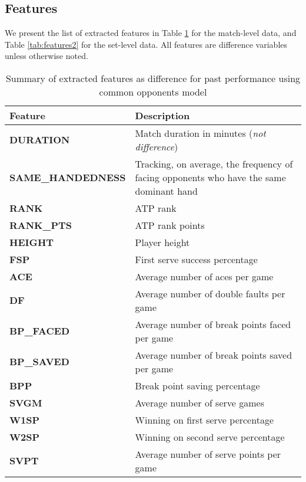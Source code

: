 \documentclass[paper=a4, fontsize=11pt]{scrartcl} %
\numberwithin{equation}{section} %
\numberwithin{figure}{section} %
\numberwithin{table}{section} %
\begin{document}
\subsection{Features}
\label{sec:feat}
We present the list of extracted features in Table \ref{tab:features} for the match-level data, and Table \ref{tab:features2} for the set-level data.  All features are difference variables unless otherwise noted. 

\begin{center}
\begin{table}[h]
    \begin{tabular}{  l | p{4cm} }
    \hline
    Feature  & Description \\ \hline
    \textbf{DURATION}  & Match duration in minutes (\textit{not difference}) \\ \hline
    \textbf{SAME\_HANDEDNESS}  & Tracking, on average, the frequency of facing opponents who have the same dominant hand \\ \hline
    \textbf{RANK}  & ATP rank \\ \hline
    \textbf{RANK\_PTS}  & ATP rank points \\ \hline
    \textbf{HEIGHT}  & Player height \\ \hline
    \textbf{FSP}  & First serve success percentage \\ \hline
    \textbf{ACE}  & Average number of aces per game \\ \hline
    \textbf{DF}  & Average number of double faults per game \\ \hline
    \textbf{BP\_FACED}  & Average number of break points faced per game \\ \hline
    \textbf{BP\_SAVED}  & Average number of break points saved per game \\ \hline
    \textbf{BPP}  & Break point saving percentage \\ \hline
    \textbf{SVGM}  & Average number of serve games \\ \hline
    \textbf{W1SP}  & Winning on first serve percentage \\ \hline
    \textbf{W2SP}  & Winning on second serve percentage \\ \hline
    \textbf{SVPT}  & Average number of serve points per game \\ \hline
    \end{tabular}
    \caption{Summary of extracted features as difference for past performance using common opponents model}
    \label{tab:features}
    \end{table}
\end{center}
\end{document}
